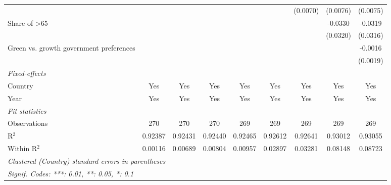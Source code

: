 \begin{table}[htbp]
\begin{tabular}{lcccccccc}
                                                     &          &          &          &          &          & (0.0070) & (0.0076) & (0.0075)\\   
      Share of >65                                   &          &          &          &          &          &          & -0.0330  & -0.0319\\   
                                                     &          &          &          &          &          &          & (0.0320) & (0.0316)\\   
      Green vs. growth government preferences        &          &          &          &          &          &          &          & -0.0016\\   
                                                     &          &          &          &          &          &          &          & (0.0019)\\   
      \midrule
      \emph{Fixed-effects}\\
      Country                                        & Yes      & Yes      & Yes      & Yes      & Yes      & Yes      & Yes      & Yes\\  
      Year                                           & Yes      & Yes      & Yes      & Yes      & Yes      & Yes      & Yes      & Yes\\  
      \midrule
      \emph{Fit statistics}\\
      Observations                                   & 270      & 270      & 270      & 269      & 269      & 269      & 269      & 269\\  
      R$^2$                                          & 0.92387  & 0.92431  & 0.92440  & 0.92465  & 0.92612  & 0.92641  & 0.93012  & 0.93055\\  
      Within R$^2$                                   & 0.00116  & 0.00689  & 0.00804  & 0.00957  & 0.02897  & 0.03281  & 0.08148  & 0.08723\\  
      \midrule \midrule
      \multicolumn{9}{l}{\emph{Clustered (Country) standard-errors in parentheses}}\\
      \multicolumn{9}{l}{\emph{Signif. Codes: ***: 0.01, **: 0.05, *: 0.1}}\\
   \end{tabular}
\end{table}


